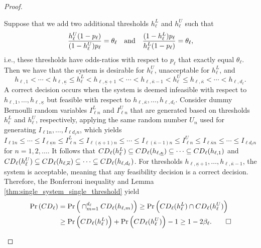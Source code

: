 \documentclass[10pt,a4paper]{amsart}
\begin{document}
\begin{proof}
\begin{itemize}
Suppose that we add two additional thresholds $h_\ell^L$ and $h_\ell^U$ such that 
\begin{equation} 
\label{eqn:LBUB}
\frac{h_\ell^U (1-p_\ell)}{(1-h_\ell^U)p_\ell}  = \theta_\ell \quad \mbox{and} \quad {(1-h_\ell^L)p_\ell \over h_\ell^L(1-p_\ell)} =\theta_\ell,
\end{equation}
i.e., these thresholds have odds-ratios with respect to $p_\ell$ that exactly equal $\theta_\ell$. Then we have that the system is desirable for $h_\ell^U$, unacceptable for $h_\ell^L$, and 
\[
h_{\ell, 1} < \cdots < h_{\ell, \underline{\kappa}} \le h_\ell^L < h_{\ell,\underline{\kappa}+1} < \cdots < h_{\ell,\overline{\kappa}-1} < h_\ell^U \le h_{\ell,\overline{\kappa}} < \cdots < h_{\ell,d_\ell}.
\]
A correct decision occurs when the system is deemed infeasible with respect to $h_{\ell,1}, \ldots, h_{\ell,\underline{\kappa}}$ but feasible with respect to $h_{\ell,\overline{\kappa}}, \ldots, h_{\ell,d_\ell}$. Consider dummy Bernoulli random variables $I_{\ell n}^{L}$ and $I_{\ell n}^{U}$ that are generated based on thresholds $h_\ell^{L}$ and $h_\ell^{U}$, respectively, applying the same random number $U_{n}$ used for generating $I_{\ell 1n},\ldots, I_{\ell d_\ell n}$, which yields $I_{\ell 1n}\leq \cdots\leq I_{\ell \underline{\kappa} n}\leq I_{\ell n}^L\leq I_{\ell (\underline{\kappa}+1) n}\leq \cdots \leq I_{\ell (\overline{\kappa}-1) n}\leq I_{\ell n}^U \leq I_{\ell \overline{\kappa} n}\leq \cdots \leq I_{\ell d_\ell n}$ for $n=1,2,\ldots$.
It follows that ${\rm CD}_\ell(h_\ell^{L}) \subseteq {\rm CD}_\ell(h_{\ell, \underline{\kappa}})  \subseteq \cdots  \subseteq {\rm CD}_\ell(h_{\ell,1})$ and ${\rm CD}_\ell(h_\ell^{U}) \subseteq {\rm CD}_\ell(h_{\ell,\overline{\kappa}}) \subseteq \cdots \subseteq  {\rm CD}_{\ell}(h_{\ell,d_\ell})$. For thresholds $h_{\ell,\underline{\kappa}+1}, \ldots, h_{ \ell, \overline{\kappa}-1}$, the system is acceptable, meaning that any feasibility decision is a correct decision. Therefore, the Bonferroni inequality and Lemma \ref{thm:single_system_single_threshold} yield
\begin{align*}
\Pr\left( {\rm CD}_\ell \right)  &= \Pr\Big(\cap_{m=1}^{d_\ell} {\rm CD}_\ell(h_{\ell, m})\Big) 
\geq \Pr\Big( {\rm CD}_\ell(h_\ell^{L}) \cap {\rm CD}_\ell(h_\ell^{U})\Big) \\
&\ge \Pr\Big( {\rm CD}_\ell(h_\ell^{L})\Big) + \Pr\Big({\rm CD}_\ell(h_\ell^{U})\Big) -1 \ge 1 - 2\beta_\ell. \tag*{$\square$}
\end{align*}
\end{itemize}
\end{proof}
\end{document}
